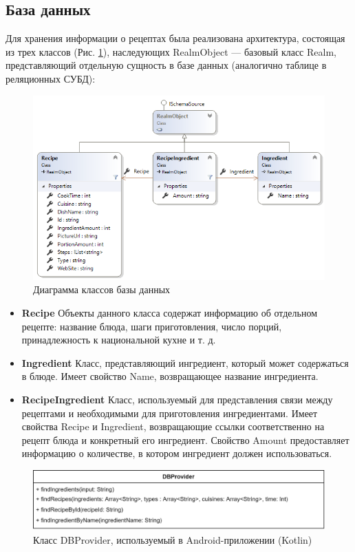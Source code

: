 \documentclass[14pt]{matmex-diploma-custom}
\begin{document}
\subsection*{База данных}

Для хранения информации о рецептах была реализована архитектура, состоящая из трех классов (Рис. \ref{database}), наследующих RealmObject --- базовый класс Realm, представляющий отдельную сущность в базе данных (аналогично таблице в реляционных СУБД):

\begin{figure}[h]
\centering
\includegraphics[width=\textwidth]{database.png}
\caption{Диаграмма классов базы данных}
\label{database}
\end{figure}

\begin{itemize}  
\item \textbf{Recipe} Объекты данного класса содержат информацию об отдельном рецепте: название блюда, шаги приготовления, число порций, принадлежность к национальной кухне и т. д.
\item \textbf{Ingredient} Класс, представляющий ингредиент, который может содержаться в блюде. Имеет свойство Name, возвращающее название ингредиента.
\item \textbf{RecipeIngredient} Класс, используемый для представления связи между рецептами и необходимыми для приготовления ингредиентами. Имеет свойства Recipe и Ingredient, возвращающие ссылки соответственно на рецепт блюда и конкретный его ингредиент. Свойство Amount предоставляет информацию о количестве, в котором ингредиент должен использоваться.
\end{itemize}

\begin{figure}[h]
\centering
\includegraphics[width=\textwidth]{dbandroid.png}
\caption{Класс DBProvider, используемый в Android-приложении (Kotlin)}
\label{dbandroid}
\end{figure}
\end{document}
